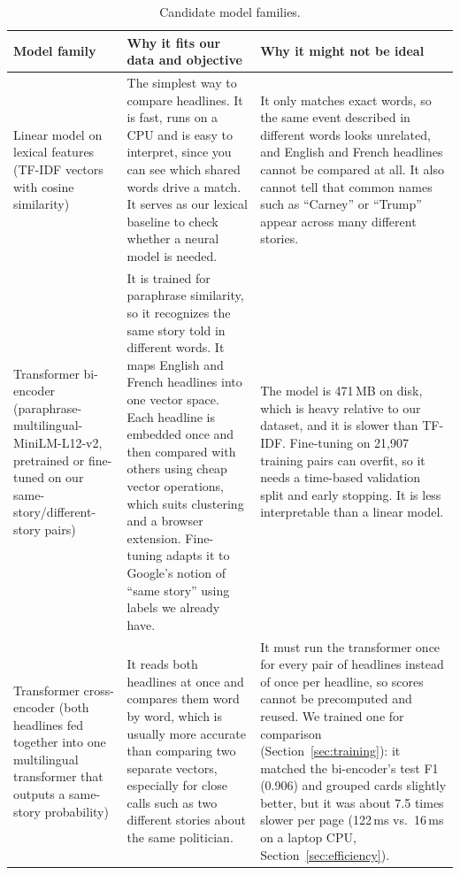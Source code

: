 \documentclass[11pt,letterpaper]{article}
\begin{document}
{\small
\begin{xltabular}{\linewidth}{L{3.3cm}YY}
\caption{Candidate model families.}\\
\toprule
\textbf{Model family} & \textbf{Why it fits our data and objective} & \textbf{Why it might not be ideal} \\
\midrule
\endhead

Linear model on lexical features (TF-IDF vectors with cosine similarity)
& The simplest way to compare headlines. It is fast, runs on a CPU and is easy to interpret, since you can see which shared words drive a match. It serves as our lexical baseline to check whether a neural model is needed.
& It only matches exact words, so the same event described in different words looks unrelated, and English and French headlines cannot be compared at all. It also cannot tell that common names such as ``Carney'' or ``Trump'' appear across many different stories. \\
\midrule
Transformer bi-encoder (paraphrase-multilingual-MiniLM-L12-v2, pretrained or fine-tuned on our same-story/different-story pairs)
& It is trained for paraphrase similarity, so it recognizes the same story told in different words. It maps English and French headlines into one vector space. Each headline is embedded once and then compared with others using cheap vector operations, which suits clustering and a browser extension. Fine-tuning adapts it to Google's notion of ``same story'' using labels we already have.
& The model is 471\,MB on disk, which is heavy relative to our dataset, and it is slower than TF-IDF. Fine-tuning on 21,907 training pairs can overfit, so it needs a time-based validation split and early stopping. It is less interpretable than a linear model. \\
\midrule
Transformer cross-encoder (both headlines fed together into one multilingual transformer that outputs a same-story probability)
& It reads both headlines at once and compares them word by word, which is usually more accurate than comparing two separate vectors, especially for close calls such as two different stories about the same politician.
& It must run the transformer once for every pair of headlines instead of once per headline, so scores cannot be precomputed and reused. We trained one for comparison (Section~\ref{sec:training}): it matched the bi-encoder's test F1 (0.906) and grouped cards slightly better, but it was about 7.5 times slower per page (122\,ms vs.\ 16\,ms on a laptop CPU, Section~\ref{sec:efficiency}). \\
\bottomrule
\end{xltabular}}
\end{document}
